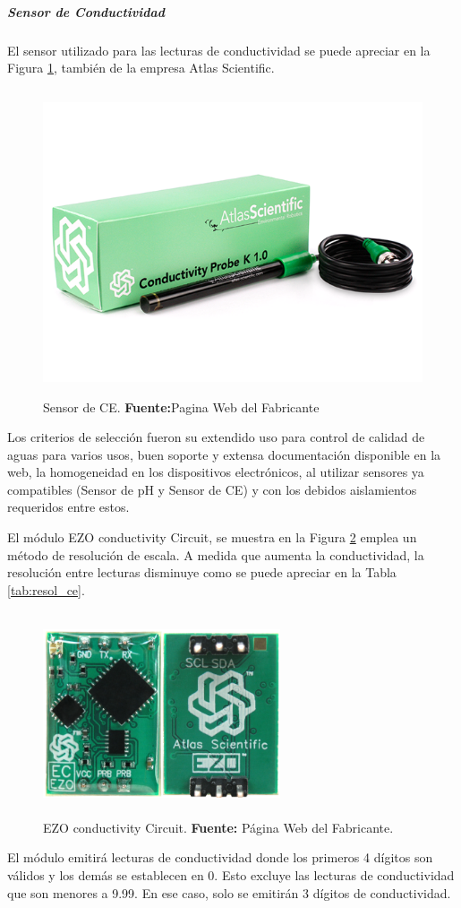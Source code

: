 \subparagraph{Sensor de Conductividad}
El sensor utilizado para las lecturas de conductividad se puede apreciar en la Figura \ref{fig:4.12}, también de la empresa Atlas Scientific.
\begin{figure}[t]
\centering
	\includegraphics[width=150mm, height=90mm]{Imagenes/2021/imag24.png}%
	\caption[Sensor de CE]{Sensor de CE.  \textbf{Fuente:}Pagina Web del Fabricante \cite{atlasce}}
	\label{fig:4.12}
\end{figure}
Los criterios de selección fueron su extendido uso para control de calidad de aguas para varios usos, buen soporte y extensa documentación disponible en la web, la homogeneidad en los dispositivos electrónicos, al utilizar sensores ya compatibles (Sensor de pH y Sensor de CE) y con los debidos aislamientos requeridos entre estos.  
 
El módulo EZO conductivity Circuit, se muestra en la Figura \ref{fig:4.13} emplea un método de resolución de escala. A medida que aumenta la conductividad, la resolución entre lecturas disminuye como se puede apreciar en la Tabla \ref{tab:resol_ce}.
\begin{figure}[b]
    \centering
    \includegraphics[width=70mm, height=60mm]{Imagenes/2021/imag28.png}
    \caption[EZO conductivity Circuit]{EZO conductivity Circuit. \textbf{Fuente: }Página Web del Fabricante.}
    \label{fig:4.13}
\end{figure}
El módulo emitirá lecturas de conductividad donde los primeros 4 dígitos son válidos y los demás se establecen en 0. Esto excluye las lecturas de conductividad que son menores a 9.99. En ese caso, solo se emitirán 3 dígitos de conductividad.

